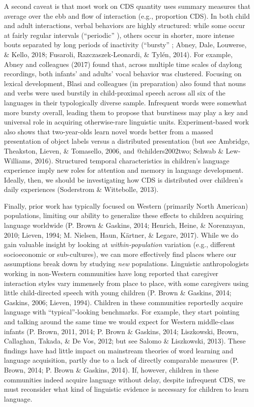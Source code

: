 \documentclass[floatsintext,man]{apa6}
\theoremstyle{definition}
\theoremstyle{definition}
\theoremstyle{definition}
\theoremstyle{remark}
\begin{document}
A second caveat is that most work on CDS quantity uses summary measures
that average over the ebb and flow of interaction (e.g., proportion
CDS). In both child and adult interactions, verbal behaviors are highly
structured: while some occur at fairly regular intervals
(\enquote{periodic} ), others occur in shorter, more intense bouts
separated by long periods of inactivity (``bursty'' ; Abney, Dale,
Louwerse, \& Kello, 2018; Fusaroli, Razczaszek-Leonardi, \& Tylén,
2014). For example, Abney and colleagues (2017) found that, across
multiple time scales of daylong recordings, both infants' and adults'
vocal behavior was clustered. Focusing on lexical development, Blasi and
colleagues (in preparation) also found that nouns and verbs were used
burstily in child-proximal speech across all six of the languages in
their typologically diverse sample. Infrequent words were somewhat more
bursty overall, leading them to propose that burstiness may play a key
and universal role in acquiring otherwise-rare linguistic units.
Experiment-based work also shows that two-year-olds learn novel words
better from a massed presentation of object labels versus a distributed
presentation (but see Ambridge, Theakston, Lieven, \& Tomasello, 2006,
and @childers2002two; Schwab \& Lew-Williams, 2016). Structured temporal
characteristics in children's language experience imply new roles for
attention and memory in language development. Ideally, then, we should
be investigating how CDS is distributed over children's daily
experiences (Soderstrom \& Wittebolle, 2013).

Finally, prior work has typically focused on Western (primarily North
American) populations, limiting our ability to generalize these effects
to children acquiring language worldwide (P. Brown \& Gaskins, 2014;
Henrich, Heine, \& Norenzayan, 2010; Lieven, 1994; M. Nielsen, Haun,
Kärtner, \& Legare, 2017). While we do gain valuable insight by looking
at \emph{within-population} variation (e.g., different socioeconomic or
sub-cultures), we can more effectively find places where our assumptions
break down by studying \emph{new} populations. Linguistic
anthropologists working in non-Western communities have long reported
that caregiver interaction styles vary immensely from place to place,
with some caregivers using little child-directed speech with young
children (P. Brown \& Gaskins, 2014; Gaskins, 2006; Lieven, 1994).
Children in these communities reportedly acquire language with
\enquote{typical}-looking benchmarks. For example, they start pointing
and talking around the same time we would expect for Western
middle-class infants (P. Brown, 2011, 2014; P. Brown \& Gaskins, 2014;
Liszkowski, Brown, Callaghan, Takada, \& De Vos, 2012; but see Salomo \&
Liszkowski, 2013). These findings have had little impact on mainstream
theories of word learning and language acquisition, partly due to a lack
of directly comparable measures (P. Brown, 2014; P. Brown \& Gaskins,
2014). If, however, children in these communities indeed acquire
language without delay, despite infrequent CDS, we must reconsider what
kind of linguistic evidence is necessary for children to learn language.
\end{document}
